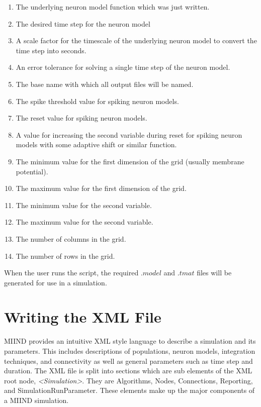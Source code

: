 \documentclass[utf8]{frontiersSCNS} %
\begin{document}
\begin{enumerate}
    \item The underlying neuron model function which was just written.
    \item The desired time step for the neuron model
    \item A scale factor for the timescale of the underlying neuron model to convert the time step into seconds.
    \item An error tolerance for solving a single time step of the neuron model.
    \item The base name with which all output files will be named.
    \item The spike threshold value for spiking neuron models.
    \item The reset value for spiking neuron models.
    \item A value for increasing the second variable during reset for spiking neuron models with some adaptive shift or similar function.
    \item The minimum value for the first dimension of the grid (usually membrane potential).
    \item The maximum value for the first dimension of the grid.
    \item The minimum value for the second variable.
    \item The maximum value for the second variable.
    \item The number of columns in the grid.
    \item The number of rows in the grid.
\end{enumerate}

When the user runs the script, the required $.model$ and $.tmat$ files will be generated for use in a simulation.

\section{Writing the XML File}

MIIND provides an intuitive XML style language to describe a simulation and its parameters. This includes descriptions of populations, neuron models, integration techniques, and connectivity as well as general parameters such as time step and duration. The XML file is split into sections which are sub elements of the XML root node, \textit{\textless Simulation\textgreater}. They are Algorithms, Nodes, Connections, Reporting, and SimulationRunParameter. These elements make up the major components of a MIIND simulation.
\end{document}
